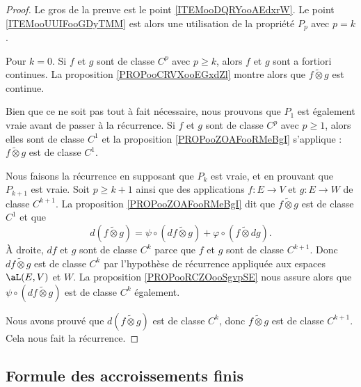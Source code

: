 \begin{proof}
    Le gros de la preuve est le point \ref{ITEMooDQRYooAEdxrW}. Le point \ref{ITEMooUUIFooGDyTMM} est alors une utilisation de la propriété \( P_p\) avec \( p=k\).

    Pour \( k=0\). Si \( f\) et \( g\) sont de classe \( C^p\) avec \( p\geq k\), alors \( f\) et \( g\) sont a fortiori continues. La proposition \ref{PROPooCRVXooEGxdZl} montre alors que \( f\tilde\otimes g\) est continue.

    Bien que ce ne soit pas tout à fait nécessaire, nous prouvons que \( P_1\) est également vraie avant de passer à la récurrence. Si \( f\) et \( g\) sont de classe \( C^p\) avec \( p\geq 1\), alors elles sont de classe \( C^1\) et la proposition \ref{PROPooZOAFooRMeBgI} s'applique : \( f\tilde\otimes g\) est de classe \( C^1\).

    Nous faisons la récurrence en supposant que \( P_k\) est vraie, et en prouvant que \( P_{k+1}\) est vraie. Soit \( p\geq k+1\) ainsi que des applications \( f\colon E\to V\) et \( g\colon E\to W\) de classe \( C^{k+1}\). La proposition \ref{PROPooZOAFooRMeBgI} dit que \( f\tilde\otimes g\) est de classe \( C^1\) et que
    \begin{equation}
        d(f\tilde\otimes g)=\psi\circ(df\tilde\otimes g)+\varphi\circ(f\tilde\otimes dg).
    \end{equation}
    À droite, \( df\) et \( g\) sont de classe \( C^k\) parce que \( f\) et \( g\) sont de classe \( C^{k+1}\). Donc \( df\tilde\otimes g\) est de classe \( C^k\) par l'hypothèse de récurrence appliquée aux espaces \( \aL(E,V)\) et \( W\). La proposition \ref{PROPooRCZOooSgvpSE} nous assure alors que \( \psi\circ(df\tilde\otimes g)\) est de classe \( C^k\) également.

    Nous avons prouvé que \( d(f\tilde\otimes g)\) est de classe \( C^k\), donc \( f\tilde\otimes g\) est de classe \( C^{k+1}\). Cela nous fait la récurrence.
\end{proof}

\subsection{Formule des accroissements finis}

